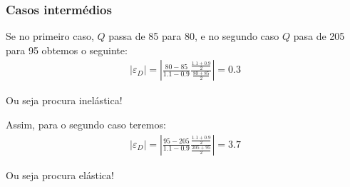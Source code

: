 \begin{frame}
	\frametitle{Casos interm\'edios}
	Se no primeiro caso, $Q$ passa de 85 para 80, e no segundo caso $Q$ pasa de 205 para 95 obtemos o seguinte:
	\begin{align*}
		|\varepsilon_D|=\left|\frac{80-85}{1.1-0.9}\frac{\frac{1.1+0.9}{2}}{\frac{80+85}{2}}\right|=0.3
	\end{align*}

	Ou seja procura inel\'astica!

	Assim, para o segundo caso teremos:
	\begin{align*}
		|\varepsilon_D|=\left|\frac{95-205}{1.1-0.9}\frac{\frac{1.1+0.9}{2}}{\frac{205+95}{2}}\right|=3.7
	\end{align*}

	Ou seja procura el\'astica!
\end{frame}